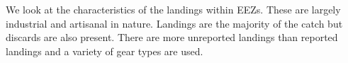 \documentclass[
  letterpaper,
  oneside,
  open=any]{scrbook}
\newenvironment{Shaded}{\begin{snugshade}}{\end{snugshade}}
\newcommand{\CommentTok}[1]{\textcolor[rgb]{0.37,0.37,0.37}{#1}}
\newcommand{\DecValTok}[1]{\textcolor[rgb]{0.68,0.00,0.00}{#1}}
\newcommand{\FloatTok}[1]{\textcolor[rgb]{0.68,0.00,0.00}{#1}}
\newcommand{\NormalTok}[1]{\textcolor[rgb]{0.00,0.23,0.31}{#1}}
\newcommand{\OtherTok}[1]{\textcolor[rgb]{0.00,0.23,0.31}{#1}}
\newcommand{\SpecialCharTok}[1]{\textcolor[rgb]{0.37,0.37,0.37}{#1}}
\begin{document}
\begin{Shaded}
\end{Shaded}

We look at the characteristics of the landings within EEZs. These are
largely industrial and artisanal in nature. Landings are the majority of
the catch but discards are also present. There are more unreported
landings than reported landings and a variety of gear types are used.
\end{document}
